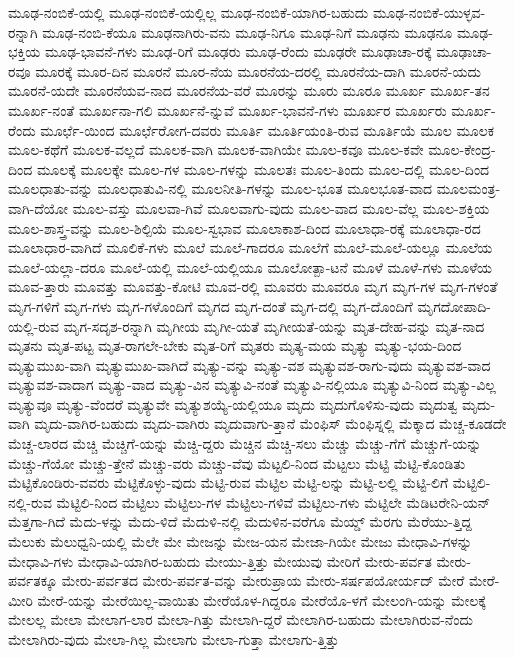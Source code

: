 {ಮೂಢ-ನಂಬಿಕೆ-ಯಲ್ಲಿ
ಮೂಢ-ನಂಬಿಕೆ-ಯಲ್ಲಿಲ್ಲ
ಮೂಢ-ನಂಬಿಕೆ-ಯಾಗಿರ-ಬಹುದು
ಮೂಢ-ನಂಬಿಕೆ-ಯುಳ್ಳವ-ರನ್ನಾಗಿ
ಮೂಢ-ನಂಬಿ-ಕೆಯೂ
ಮೂಢನಾಗಿರು-ವನು
ಮೂಢ-ನಿಗೂ
ಮೂಢ-ನಿಗೆ
ಮೂಢನು
ಮೂಢನೂ
ಮೂಢ-ಭಕ್ತಿಯ
ಮೂಢ-ಭಾವನೆ-ಗಳು
ಮೂಢ-ರಿಗೆ
ಮೂಢರು
ಮೂಢ-ರೆಂದು
ಮೂಢರೇ
ಮೂಢಾಚಾ-ರಕ್ಕೆ
ಮೂಢಾಚಾ-ರವೂ
ಮೂರಕ್ಕೆ
ಮೂರ-ದಿನ
ಮೂರನೆ
ಮೂರ-ನೆಯ
ಮೂರನೆಯ-ದರಲ್ಲಿ
ಮೂರನೆಯ-ದಾಗಿ
ಮೂರನೆ-ಯದು
ಮೂರನೆ-ಯದೇ
ಮೂರನೆಯವ-ನಾದ
ಮೂರನೆಯ-ವರೆ
ಮೂರನ್ನು
ಮೂರು
ಮೂರೂ
ಮೂರ್ಖ
ಮೂರ್ಖ-ತನ
ಮೂರ್ಖ-ನಂತೆ
ಮೂರ್ಖನಾ-ಗಲಿ
ಮೂರ್ಖನೆ-ನ್ನುವೆ
ಮೂರ್ಖ-ಭಾವನೆ-ಗಳು
ಮೂರ್ಖರ
ಮೂರ್ಖರು
ಮೂರ್ಖ-ರೆಂದು
ಮೂರ್ಛೆ-ಯಿಂದ
ಮೂರ್ಛೆರೋಗ-ದವರು
ಮೂರ್ತಿ
ಮೂರ್ತಿಯಂತಿ-ರುವ
ಮೂರ್ತಿಯೆ
ಮೂಲ
ಮೂಲಕ
ಮೂಲ-ಕಥೆಗೆ
ಮೂಲಕ-ವಲ್ಲದೆ
ಮೂಲಕ-ವಾಗಿ
ಮೂಲಕ-ವಾಗಿಯೇ
ಮೂಲ-ಕವೂ
ಮೂಲ-ಕವೇ
ಮೂಲ-ಕೇಂದ್ರ-ದಿಂದ
ಮೂಲಕ್ಕೆ
ಮೂಲಕ್ಕೇ
ಮೂಲ-ಗಳ
ಮೂಲ-ಗಳನ್ನು
ಮೂಲತಃ
ಮೂಲ-ತಿಂದು
ಮೂಲ-ದಲ್ಲಿ
ಮೂಲ-ದಿಂದ
ಮೂಲಧಾತು-ವನ್ನು
ಮೂಲಧಾತುವಿ-ನಲ್ಲಿ
ಮೂಲನೀತಿ-ಗಳನ್ನು
ಮೂಲ-ಭೂತ
ಮೂಲಭೂತ-ವಾದ
ಮೂಲಮಂತ್ರ-ವಾಗಿ-ದೆಯೋ
ಮೂಲ-ವಸ್ತು
ಮೂಲವಾ-ಗಿವೆ
ಮೂಲವಾಗು-ವುದು
ಮೂಲ-ವಾದ
ಮೂಲ-ವೆಲ್ಲ
ಮೂಲ-ಶಕ್ತಿಯ
ಮೂಲ-ಶಾಸ್ತ್ರ-ವನ್ನು
ಮೂಲ-ಶಿಲ್ಪಿಯೆ
ಮೂಲ-ಸ್ವಭಾವ
ಮೂಲಾಕಾಶ-ದಿಂದ
ಮೂಲಾಧಾ-ರಕ್ಕೆ
ಮೂಲಾಧಾ-ರದ
ಮೂಲಾಧಾರ-ವಾಗಿದೆ
ಮೂಲಿಕೆ-ಗಳು
ಮೂಲೆ
ಮೂಲೆ-ಗಾದರೂ
ಮೂಲೆಗೆ
ಮೂಲೆ-ಮೂಲೆ-ಯಲ್ಲೂ
ಮೂಲೆಯ
ಮೂಲೆ-ಯಲ್ಲಾ-ದರೂ
ಮೂಲೆ-ಯಲ್ಲಿ
ಮೂಲೆ-ಯಲ್ಲಿಯೂ
ಮೂಲೋತ್ಪಾ-ಟನೆ
ಮೂಳೆ
ಮೂಳೆ-ಗಳು
ಮೂಳೆಯ
ಮೂವ-ತ್ತಾರು
ಮೂವತ್ತು
ಮೂವತ್ತು-ಕೋಟಿ
ಮೂವ-ರಲ್ಲಿ
ಮೂವರು
ಮೂವರೂ
ಮೃಗ
ಮೃಗ-ಗಳ
ಮೃಗ-ಗಳಂತೆ
ಮೃಗ-ಗಳಿಗೆ
ಮೃಗ-ಗಳು
ಮೃಗ-ಗಳೊಂದಿಗೆ
ಮೃಗದ
ಮೃಗ-ದಂತೆ
ಮೃಗ-ದಲ್ಲಿ
ಮೃಗ-ದೊಂದಿಗೆ
ಮೃಗದೋಪಾದಿ-ಯಲ್ಲಿ-ರುವ
ಮೃಗ-ಸದೃಶ-ರನ್ನಾಗಿ
ಮೃಗೀಯ
ಮೃಗೀ-ಯತೆ
ಮೃಗೀಯತೆ-ಯನ್ನು
ಮೃತ-ದೇಹ-ವನ್ನು
ಮೃತ-ನಾದ
ಮೃತನು
ಮೃತ-ಪಟ್ಟ
ಮೃತ-ರಾಗಲೇ-ಬೇಕು
ಮೃತ-ರಿಗೆ
ಮೃತರು
ಮೃತ್ಯ-ಮಯ
ಮೃತ್ಯು
ಮೃತ್ಯು-ಭಯ-ದಿಂದ
ಮೃತ್ಯುಮುಖ-ವಾಗಿ
ಮೃತ್ಯುಮುಖ-ವಾಗಿದೆ
ಮೃತ್ಯು-ವನ್ನು
ಮೃತ್ಯು-ವಶ
ಮೃತ್ಯುವಶ-ರಾಗು-ವುದು
ಮೃತ್ಯುವಶ-ವಾದ
ಮೃತ್ಯುವಶ-ವಾದಾಗ
ಮೃತ್ಯು-ವಾದ
ಮೃತ್ಯು-ವಿನ
ಮೃತ್ಯುವಿ-ನಂತೆ
ಮೃತ್ಯುವಿ-ನಲ್ಲಿಯೂ
ಮೃತ್ಯುವಿ-ನಿಂದ
ಮೃತ್ಯು-ವಿಲ್ಲ
ಮೃತ್ಯುವೂ
ಮೃತ್ಯು-ವೆಂದರೆ
ಮೃತ್ಯುವೇ
ಮೃತ್ಯುಶಯ್ಯೆ-ಯಲ್ಲಿಯೂ
ಮೃದು
ಮೃದುಗೊಳಿಸು-ವುದು
ಮೃದುತ್ವ
ಮೃದು-ವಾಗಿ
ಮೃದು-ವಾಗಿರ-ಬಹುದು
ಮೃದು-ವಾಗಿರು
ಮೃದುವಾಗು-ತ್ತಾನೆ
ಮೆಂಫಿಸ್
ಮೆಂಫಿಸ್ನಲ್ಲಿ
ಮೆಕ್ಕಾದ
ಮೆಚ್ಚ-ಕೂಡದೇ
ಮೆಚ್ಚ-ಲಾರದ
ಮೆಚ್ಚಿ
ಮೆಚ್ಚಿಗೆ-ಯನ್ನು
ಮೆಚ್ಚಿ-ದ್ದರು
ಮೆಚ್ಚಿನ
ಮೆಚ್ಚಿ-ಸಲು
ಮೆಚ್ಚು
ಮೆಚ್ಚು-ಗೆಗೆ
ಮೆಚ್ಚುಗೆ-ಯನ್ನು
ಮೆಚ್ಚು-ಗೆಯೋ
ಮೆಚ್ಚು-ತ್ತೇನೆ
ಮೆಚ್ಚು-ವರು
ಮೆಚ್ಚು-ವೆವು
ಮೆಟ್ಟಲಿ-ನಿಂದ
ಮೆಟ್ಟಲು
ಮೆಟ್ಟಿ
ಮೆಟ್ಟಿ-ಕೊಂಡಿತು
ಮೆಟ್ಟಿಕೊಂಡಿರು-ವವರು
ಮೆಟ್ಟಿಕೊಳ್ಳು-ವುದು
ಮೆಟ್ಟಿ-ರುವ
ಮೆಟ್ಟಿಲ
ಮೆಟ್ಟಿ-ಲನ್ನು
ಮೆಟ್ಟಿ-ಲಲ್ಲಿ
ಮೆಟ್ಟಿ-ಲಿಗೆ
ಮೆಟ್ಟಿಲಿ-ನಲ್ಲಿ-ರುವ
ಮೆಟ್ಟಿಲಿ-ನಿಂದ
ಮೆಟ್ಟಿಲು
ಮೆಟ್ಟಿಲು-ಗಳ
ಮೆಟ್ಟಿಲು-ಗಳಿವೆ
ಮೆಟ್ಟಿಲು-ಗಳು
ಮೆಟ್ಟಿಲೇ
ಮೆಡಿಟರೇನಿ-ಯನ್
ಮೆತ್ತಗಾ-ಗಿದೆ
ಮೆದು-ಳನ್ನು
ಮೆದು-ಳಿದೆ
ಮೆದುಳಿ-ನಲ್ಲಿ
ಮೆದುಳಿನ-ವರೆಗೂ
ಮೆಯ್ಡ್
ಮೆರಗು
ಮೆರೆಯು-ತ್ತಿದ್ದ
ಮೆಲುಕು
ಮೆಲುಧ್ವನಿ-ಯಲ್ಲಿ
ಮೆಲೇ
ಮೇ
ಮೇಜನ್ನು
ಮೇಜ-ಯನ
ಮೇಜಾ-ಗಿಯೇ
ಮೇಜು
ಮೇಧಾವಿ-ಗಳನ್ನು
ಮೇಧಾವಿ-ಗಳು
ಮೇಧಾವಿ-ಯಾಗಿರ-ಬಹುದು
ಮೇಯು-ತ್ತಿತ್ತು
ಮೇಯುವು
ಮೇರಿಗೆ
ಮೇರು-ಪರ್ವತ
ಮೇರು-ಪರ್ವತಕ್ಕೂ
ಮೇರು-ಪರ್ವತದ
ಮೇರು-ಪರ್ವತ-ವನ್ನು
ಮೇರುಪ್ರಾಯ
ಮೇರು-ಸರ್ಷಪಯೋರ್ಯದ್
ಮೇರೆ
ಮೇರೆ-ಮೀರಿ
ಮೇರೆ-ಯನ್ನು
ಮೇರೆಯಿಲ್ಲ-ವಾಯಿತು
ಮೇರೆಯೊಳ-ಗಿದ್ದರೂ
ಮೇರೆಯೊ-ಳಗೆ
ಮೇಲಂಗಿ-ಯನ್ನು
ಮೇಲಕ್ಕೆ
ಮೇಲಲ್ಲ
ಮೇಲಾ
ಮೇಲಾಗ-ಲಾರ
ಮೇಲಾ-ಗಿತ್ತು
ಮೇಲಾಗಿ-ದ್ದರೆ
ಮೇಲಾಗಿರ-ಬಹುದು
ಮೇಲಾಗಿರುವ-ನೆಂದು
ಮೇಲಾಗಿರು-ವುದು
ಮೇಲಾ-ಗಿಲ್ಲ
ಮೇಲಾಗು
ಮೇಲಾ-ಗುತ್ತಾ
ಮೇಲಾಗು-ತ್ತಿತ್ತು
}
